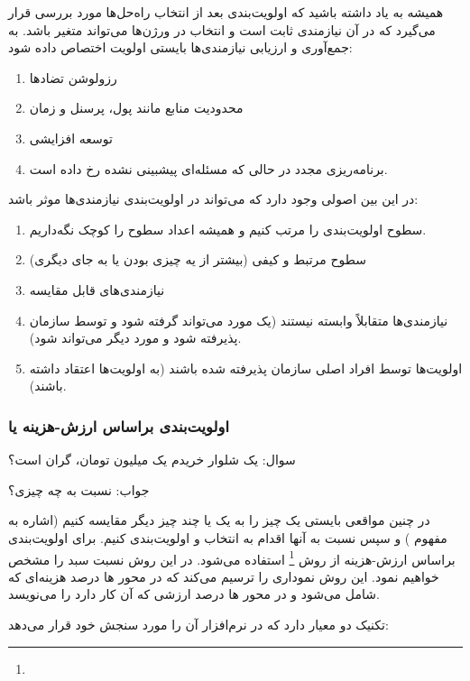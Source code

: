 همیشه به یاد داشته باشید که اولویت‌بندی بعد از انتخاب راه‌حل‌ها مورد بررسی قرار
می‌گیرد که در آن نیازمندی ثابت است و انتخاب در ورژن‌ها می‌تواند متغیر باشد. به
جمع‌آوری و ارزیابی نیازمندی‌ها بایستی اولویت اختصاص داده شود:

\begin{enumerate}
    \item رزولوشن تضاد‌ها
    \item محدودیت منابع مانند پول، پرسنل و زمان
    \item توسعه افزایشی
    \item برنامه‌ریزی مجدد در حالی که مسئله‌ای  پیشبینی نشده رخ داده است.
\end{enumerate}

در این بین اصولی وجود دارد که می‌تواند در اولویت‌بندی نیازمندی‌ها موثر باشد:

\begin{enumerate}
    \item سطوح اولویت‌بندی را مرتب کنیم و همیشه اعداد سطوح را کوچک نگه‌داریم.
    \item سطوح مرتبط و کیفی (بیشتر از یه چیزی بودن یا به جای دیگری)
    \item نیازمندی‌های قابل مقایسه
    \item نیازمندی‌ها متقابلاً وابسته نیستند (یک مورد می‌تواند گرفته شود و توسط
    سازمان پذیرفته شود و مورد دیگر می‌تواند  شود).
    \item اولویت‌ها توسط افراد اصلی سازمان پذیرفته شده باشند (به اولویت‌ها
    اعتقاد داشته باشند).
\end{enumerate}

\subsubsection{اولویت‌بندی براساس ارزش-هزینه یا }

سوال: یک شلوار خریدم یک میلیون تومان، گران است؟

جواب: نسبت به چه چیزی؟

در چنین مواقعی بایستی یک چیز را به یک یا چند چیز دیگر مقایسه کنیم (اشاره به
مفهوم ) و سپس نسبت به آنها اقدام به انتخاب و اولویت‌بندی کنیم.
برای اولویت‌بندی براساس ارزش-هزینه از روش \footnote{} استفاده می‌شود. در این روش نسبت سبد را مشخص خواهیم نمود. این
روش نموداری را ترسیم می‌کند که در محور ها درصد هزینه‌ای که شامل می‌شود و
در محور ها درصد ارزشی که آن کار دارد را می‌نویسد.

تکنیک  دو معیار دارد که در نرم‌افزار آن را مورد سنجش خود قرار می‌دهد:


